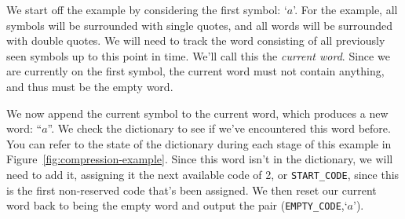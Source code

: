 We start off the example by considering the first symbol: `$a$'. For the
example, all symbols will be surrounded with single quotes, and all words will
be surrounded with double quotes. We will need to track the word consisting of
all previously seen symbols up to this point in time. We'll call this the
\emph{current word}. Since we are currently on the first symbol, the current
word must not contain anything, and thus must be the empty word.

We now append the current symbol to the current word, which produces a new word:
``$a$''. We check the dictionary to see if we've encountered this word before.
You can refer to the state of the dictionary during each stage of this example
in Figure~\ref{fig:compression-example}. Since this word isn't in the
dictionary, we will need to add it, assigning it the next available code of 2,
or \texttt{START\_CODE}, since this is the first non-reserved code that's been
assigned. We then reset our current word back to being the empty word and output
the pair (\texttt{EMPTY\_CODE},\;`$a$').

